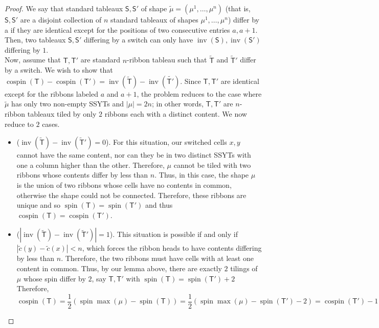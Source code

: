\documentclass[11pt,leqno,oneside]{amsart}
\numberwithin{thm}{section}
\newcommand{\T}{\mathsf{T}} %
\renewcommand{\S}{\mathsf{S}}
\newcommand{\inv}{\operatorname{inv}}
\newcommand{\spin}{\operatorname{spin}}
\newcommand{\cospin}{\operatorname{cospin}}
\begin{document}
\begin{proof}
  We say that standard tableaux \(\S, \S'\) of shape \(\tilde{\mu} =
  (\mu^1, \dots, \mu^n)\)  (that is, \(\S,\S'\) are a disjoint
  collection of \(n\) standard tableaux of shapes \(\mu^1, \ldots,
  \mu^n\)) differ by a  if they are
  identical except for the positions of two consecutive entries \(a,
  a+1\). Then, two tableaux \(\S,\S'\) differing by a switch can only have
  \(\inv(\S), \inv(\S')\) differing by \(1\). \\

  Now, assume that \(\T,\T'\) are standard \(n\)-ribbon tableau such
  that \(\tilde{\T}\) and \(\tilde{\T}'\) differ by a switch. We
  wish to show that \(\cospin(\T)-\cospin(\T') =
  \inv(\tilde{\T})-\inv(\tilde{\T'})\). Since \(\T,\T'\) are identical
  except for the ribbons labeled \(a\) and \(a+1\), the problem
  reduces to the case where \(\tilde{\mu}\) has only two non-empty SSYTs and
  \(|\mu| = 2n\); in other words, \(\T,\T'\) are \(n\)-ribbon tableaux
  tiled by only \(2\) ribbons each with a distinct content. We now
  reduce to \(2\) cases. 
  \begin{itemize}
  \item (\(\inv(\tilde{\T})-\inv(\tilde{\T}') = 0\)). For this situation, our switched
    cells \(x,y\) cannot have the same content, nor can they be in two
    distinct SSYTs with one a column higher than the
    other. Therefore, \(\mu\) cannot be tiled with two ribbons whose
    contents differ by less than \(n\). Thus, in this case, the shape \(\mu\) is
    the union of two ribbons whose cells have no contents in common,
    otherwise the shape could not be connected. Therefore, these
    ribbons are unique and so \(\spin(\T) = \spin(\T')\) and thus
    \(\cospin(\T) = \cospin(\T')\).
  \item (\(|\inv(\tilde{\T})-\inv(\tilde{\T}')| = 1\)). This situation is possible if and
    only if \(|\tilde{c}(y)-\tilde{c}(x)| < n\), which forces the
    ribbon heads to have contents differing by less than
    \(n\). Therefore, the two ribbons must have cells with at least
    one content in common. Thus, by our lemma above, there are exactly
    \(2\) tilings of \(\mu\) whose spin differ by \(2\), say
    \(\T,\T'\) with \(\spin(\T) = \spin(\T')+2\) Therefore, \[
      \cospin(\T) = \frac{1}{2}(\spin \max(\mu) - \spin(\T)) =
      \frac{1}{2}(\spin \max(\mu) - \spin(\T')-2) = \cospin(\T')-1
    \]
  \end{itemize}
\end{proof}
\end{document}
